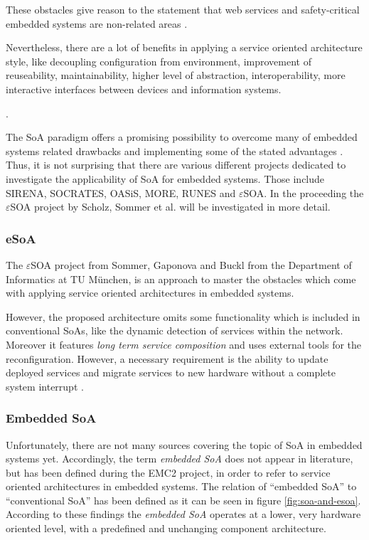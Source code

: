 These obstacles give reason to the statement that web services and safety-critical embedded systems are non-related areas \cite{rodrigues2011}.

Nevertheless, there are a lot of benefits in applying a service oriented architecture style, like decoupling configuration from environment, improvement of reuseability, maintainability, higher level of abstraction, interoperability, more interactive interfaces between devices and information systems.

\cite{buckl}.

The SoA paradigm offers a promising possibility to overcome many of embedded systems related drawbacks and implementing some of the stated advantages \cite{buckl} \cite{sommer}. Thus, it is not surprising that there are various different projects dedicated to investigate the applicability of SoA for embedded systems. Those include SIRENA, SOCRATES, OASiS, MORE, RUNES and $\varepsilon$SOA. In the proceeding the $\varepsilon$SOA project by Scholz, Sommer et al. \cite{scholz} \cite{sommer} \cite{buckl} will be investigated in more detail.

\subsubsection*{eSoA}
The $\varepsilon$SOA project from Sommer, Gaponova and Buckl from the Department of Informatics at TU München, is an approach to master the obstacles which come with applying service oriented architectures in embedded systems.

However, the proposed architecture omits some functionality which is included in 
conventional SoAs, like the dynamic detection of services within the network. Moreover it features \emph{long term service composition} and uses external tools for the reconfiguration. However, a necessary requirement is the ability to update deployed services and migrate services to new hardware without a complete system interrupt \cite{sommer}.

\subsubsection*{Embedded SoA}
Unfortunately, there are not many sources covering the topic of SoA in embedded systems yet. Accordingly, the term \emph{embedded SoA} does not appear in literature, but has been defined during the EMC2 project, in order to refer to service oriented architectures in embedded systems. The relation of ``embedded SoA'' to ``conventional SoA'' has been defined as it can be seen in figure \ref{fig:soa-and-esoa}. According to these findings the \emph{embedded SoA} operates at a lower, very hardware oriented level, with a predefined and unchanging component architecture. 

